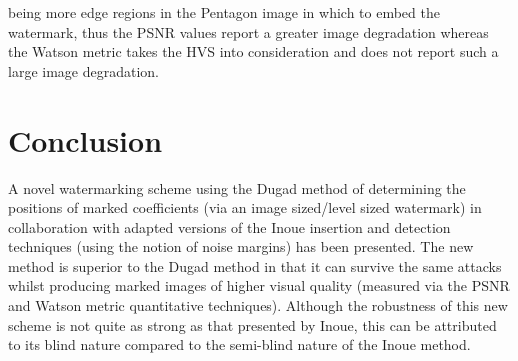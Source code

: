 \documentclass[12pt]{report}
\renewcommand{\baselinestretch}{1.5}
\begin{document}
being more edge regions in the Pentagon image in which to embed the watermark, thus the PSNR values report
a greater image degradation whereas the Watson metric takes the HVS into consideration and does not report 
such a large image degradation. 
\begin{table}
\renewcommand{\baselinestretch}{1.5}
\caption{Worst case $P_{fp}$ values for the novel system using Pentagon image}
\label{PfpResPentDI}
\end{table}

\section{Conclusion}
A novel watermarking scheme using the Dugad method of determining the positions
of marked coefficients (via an image sized/level sized watermark)
in collaboration with adapted versions of the Inoue 
insertion and detection techniques (using the notion of noise margins)
has been
presented. The new method is superior
to the Dugad method in that it can survive the same attacks
whilst producing marked images of higher visual 
quality (measured via the PSNR and Watson metric quantitative techniques). 
Although the robustness of this new scheme is not quite as 
strong as that presented by Inoue, this can be attributed
to its blind nature compared to the semi-blind nature
of the
Inoue method. 
			
\end{document}
